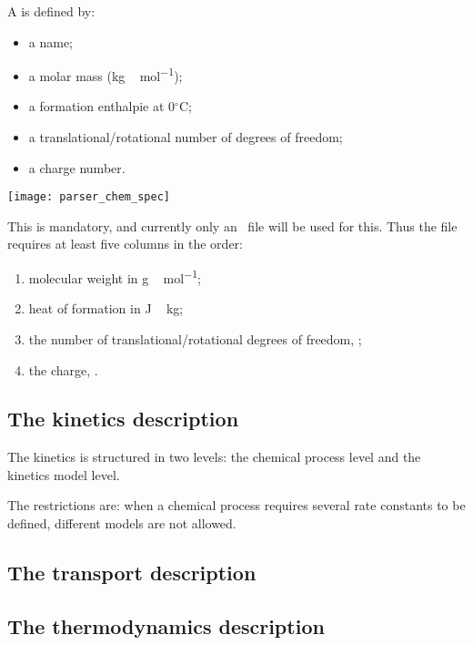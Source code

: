 A  is defined by:\\
\begin{minipage}{0.48\linewidth}
\begin{itemize}
\item a name;
\item a molar mass (\unit{kg\,mol^{-1}});
\item a formation enthalpie at 0$^\circ$\unit{C};
\item a translational/rotational number of degrees of freedom;
\item a charge number.
\end{itemize}
\end{minipage}
\hfill
\begin{minipage}{0.48\linewidth}
\centering
\texttt{[image: parser\_chem\_spec]}
\end{minipage}
\smallskip

This is mandatory, and currently only an \ascii\ file
will be used for this. Thus the file requires at least
five columns in the order:
\begin{enumerate}
\item molecular weight in \unit{g\,mol^{-1}};
\item heat of formation in \unit{J\,kg};
\item the number of translational/rotational degrees of freedom, \nounit;
\item the charge, \nounit.
\end{enumerate}

\subsection{The kinetics description}

The kinetics is structured in two levels: the chemical
process level and the kinetics model level.

The restrictions are:
when a chemical process requires several rate constants to
be defined, different models are not allowed.

\subsection{The transport description}

\subsection{The thermodynamics description}
